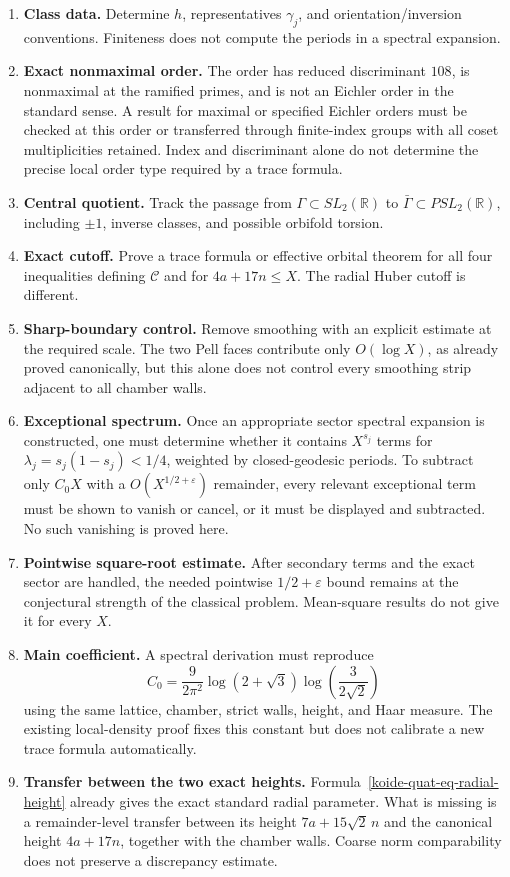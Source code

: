 \begin{enumerate}
\def\labelenumi{\arabic{enumi}.}
\item
  \textbf{Class data.} Determine \(h\), representatives \(\gamma_j\), and orientation/inversion conventions. Finiteness does not compute the periods in a spectral expansion.
\item
  \textbf{Exact nonmaximal order.} The order has reduced discriminant \(108\), is nonmaximal at the ramified primes, and is not an Eichler order in the standard sense. A result for maximal or specified Eichler orders must be checked at this order or transferred through finite-index groups with all coset multiplicities retained. Index and discriminant alone do not determine the precise local order type required by a trace formula.
\item
  \textbf{Central quotient.} Track the passage from \(\Gamma\subset SL_2(\mathbb R)\) to \(\bar\Gamma\subset PSL_2(\mathbb R)\), including \(\pm1\), inverse classes, and possible orbifold torsion.
\item
  \textbf{Exact cutoff.} Prove a trace formula or effective orbital theorem for all four inequalities defining \(\mathcal C\) and for \(4a+17n\le X\). The radial Huber cutoff is different.
\item
  \textbf{Sharp-boundary control.} Remove smoothing with an explicit estimate at the required scale. The two Pell faces contribute only \(O(\log X)\), as already proved canonically, but this alone does not control every smoothing strip adjacent to all chamber walls.
\item
  \textbf{Exceptional spectrum.} Once an appropriate sector spectral expansion is constructed, one must determine whether it contains \(X^{s_j}\) terms for \(\lambda_j=s_j(1-s_j)<1/4\), weighted by closed-geodesic periods. To subtract only \(C_0X\) with a \(O(X^{1/2+\varepsilon})\) remainder, every relevant exceptional term must be shown to vanish or cancel, or it must be displayed and subtracted. No such vanishing is proved here.
\item
  \textbf{Pointwise square-root estimate.} After secondary terms and the exact sector are handled, the needed pointwise \(1/2+\varepsilon\) bound remains at the conjectural strength of the classical problem. Mean-square results do not give it for every \(X\).
\item
  \textbf{Main coefficient.} A spectral derivation must reproduce \[
  C_0=\frac{9}{2\pi^2}\log(2+\sqrt3)
      \log\!\left(\frac3{2\sqrt2}\right)
  \] using the same lattice, chamber, strict walls, height, and Haar measure. The existing local-density proof fixes this constant but does not calibrate a new trace formula automatically.
\item
  \textbf{Transfer between the two exact heights.} Formula~\eqref{koide-quat-eq-radial-height} already gives the exact standard radial parameter. What is missing is a remainder-level transfer between its height \(7a+15\sqrt2\,n\) and the canonical height \(4a+17n\), together with the chamber walls. Coarse norm comparability does not preserve a discrepancy estimate.
\end{enumerate}


